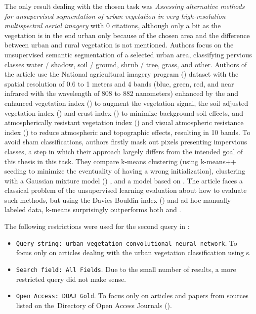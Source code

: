 The only result dealing with the chosen task was \textit{Assessing alternative methods for unsupervised segmentation of urban vegetation in very high-resolution multispectral aerial imagery} \cite{urban-green-unsupervised-aerial} with 0 citations, although only a bit as the vegetation is in the end urban only because of the chosen area and the difference between urban and rural vegetation is not mentioned. Authors focus on the unsupervised semantic segmentation of a selected urban area, classifying pervious classes water / shadow, soil / ground, shrub / tree, grass, and other. Authors of the article use the National agricultural imagery program () dataset with the spatial resolution of 0.6 to 1 meters and 4 bands (blue, green, red, and near infrared with the wavelength of 808 to 882 nanometers) enhanced by the  and enhanced vegetation index () to augment the vegetation signal, the soil adjusted vegetation index () and crust index () to minimize background soil effects, and atmospherically resistant vegetation index () and visual atmospheric resistance index () to reduce atmospheric and topographic effects, resulting in 10 bands. To avoid sham classifications, authors firstly mask out pixels presenting impervious classes, a step in which their approach largely differs from the intended goal of this thesis in this task. They compare k-means clustering \cite{k-means} (using k-means++ seeding \cite{k-means-plusplus} to minimize the eventuality of having a wrong initialization), clustering with a Gaussian mixture model () \cite{gmm}, and a  model based on \cite{cnn-hs-unsupervised-fuzzy}. The article faces a classical problem of the unsupervised learning evaluation about how to evaluate such methods, but using the Davies-Bouldin index () \cite{dbi} and ad-hoc manually labeled data, k-means surprisingly outperforms both  and .


The following restrictions were used for the second query in :

\begin{itemize}
	\item \verb|Query string: urban vegetation convolutional neural network|. To focus only on articles dealing with the urban vegetation classification using s.
	\item \verb|Search field: All Fields|. Due to the small number of results, a more restricted query did not make sense.
	\item \verb|Open Access: DOAJ Gold|. To focus only on articles and papers from sources listed on the~Di\-rectory of Open Access Journals ().
\end{itemize}

